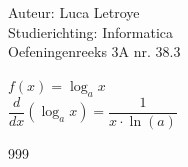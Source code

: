 \documentclass[a4paper]{article}
\newcommand{\ddx}{\dfrac{d}{dx}}
\begin{document}
  
\noindent \large Auteur: Luca Letroye \\
\noindent \large Studierichting: Informatica\\
\noindent \large Oefeningenreeks 3A nr. 38.3\\

\medskip


\normalsize

$ f(x) =  \log_ax $ \\

$\ddx (\log_ax) = \dfrac{1}{x\cdot \ln(a)}$\\



\begin{thebibliography}{999}
\end{thebibliography}
\end{document}
